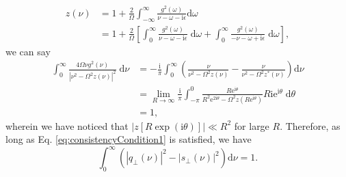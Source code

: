 \documentclass{article}
\begin{document}
\begin{equation}
\begin{split}
z(\nu) &= 1 + \frac{2}{\Omega}\int_{-\infty}^\infty \frac{g^2(\omega)}{\nu - \omega - \mathrm{i}\epsilon}\mathrm{d}\omega\\
&= 1 + \frac{2}{\Omega}\left[\int_0^\infty \frac{g^2(\omega)}{\nu - \omega - \mathrm{i}\epsilon}\;\mathrm{d}\omega + \int^{\infty}_{0} \frac{g^2(\omega)}{-\nu - \omega + \mathrm{i}\epsilon}\;\mathrm{d}\omega\right],
\end{split}
\end{equation}
we can say
\begin{equation}
\begin{split}
\int_{0}^\infty\frac{4\Omega\nu g^2(\nu)}{|\nu^2 - \Omega^2z(\nu)|^2}\;\mathrm{d}\nu &= -\frac{\mathrm{i}}{\pi}\int_0^\infty\left(\frac{\nu}{\nu^2 - \Omega^2z(\nu)} - \frac{\nu}{\nu^2 - \Omega^2z^*(\nu)}\right)\mathrm{d}\nu\\
&= \lim_{R\to\infty}\frac{\mathrm{i}}{\pi}\int_{-\pi}^0\frac{R\mathrm{e}^{\mathrm{i}\theta}}{R^2\mathrm{e}^{2\mathrm{i}\theta} - \Omega^2z(R\mathrm{e}^{\mathrm{i}\theta})}R\mathrm{i}\mathrm{e}^{\mathrm{i}\theta}\;\mathrm{d}\theta\\
&= 1,
\end{split}
\end{equation}
wherein we have noticed that $|z[R\exp(\mathrm{i}\theta)]|\ll R^2$ for large $R$. Therefore, as long as Eq. \eqref{eq:consistencyCondition1} is satisfied, we have
\begin{equation}
\int_{0}^\infty\left(|q_\perp(\nu)|^2 - |s_\perp(\nu)|^2\right)\mathrm{d}\nu = 1.
\end{equation}
\end{document}
